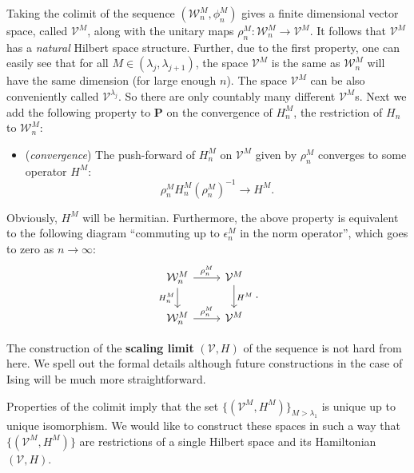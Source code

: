 \documentclass[twoside,11pt,titlepage]{amsart}
\renewcommand{\=}[1]{\stackrel{#1}{=}} %
\theoremstyle{definition}
\theoremstyle{remark}
\begin{document}
Taking the colimit of the sequence $(\mathcal{W}_n^M,\phi_n^M)$ gives a finite dimensional vector space, called $\mathcal{V}^M$, along with the unitary maps $\rho_n^M : \mathcal{W}_n^M \to \mathcal{V}^M$. It follows that  $\mathcal{V}^M$ has a \textit{natural} Hilbert space structure. Further, due to the first property, one can easily see that for all $M\in (\lambda_j,\lambda_{j+1})$, the space $\mathcal{V}^M$ is the same as $\mathcal{W}_n^M$ will have the same dimension (for large enough $n$). The space $\mathcal{V}^M$ can be also conveniently called $\mathcal{V}^{\lambda_j}$. So there are only countably many different $\mathcal{V}^M$s. Next we add the following property to \textbf{P} on the convergence of $H_n^M$, the restriction of $H_n$ to $\mathcal{W}_n^M$: 
\begin{itemize}
\item (\textit{convergence}) The push-forward of $H_n^M$ on $\mathcal{V}^M$ given by $\rho_n^M$ converges to some operator $H^M$:
$$\rho_n^MH_n^M(\rho_n^M)^{-1} \to H^M.$$
\end{itemize}

Obviously, $H^M$ will be hermitian. Furthermore, the above property is equivalent to the following diagram ``commuting up to $\epsilon_{n}^M$ in the norm operator'', which goes to zero as $n \to \infty$:
\[ 
\begin{tikzcd}
\mathcal{W}_n^M \arrow{r}{\rho_n^M} \arrow[swap]{d}{H_n^M} & \mathcal{V}^M \arrow{d}{H^M} \\
\mathcal{W}_n^M \arrow{r}{\rho_n^M}& \mathcal{V}^M
\end{tikzcd}.
\]
  
The construction of the \textbf{scaling limit} $(\mathcal{V},H)$ of the sequence is not hard from here. We spell out the formal details although future constructions in the case of Ising will be much more straightforward.

Properties of the colimit imply that the set $\{(\mathcal{V}^M,H^M)\}_{M > \lambda_1}$ is unique up to unique isomorphism. We would like to construct these spaces in such a way that $\{(\mathcal{V}^M,H^M)\}$ are restrictions of a single Hilbert space and its Hamiltonian $(\mathcal{V},H)$. 
\end{document}
